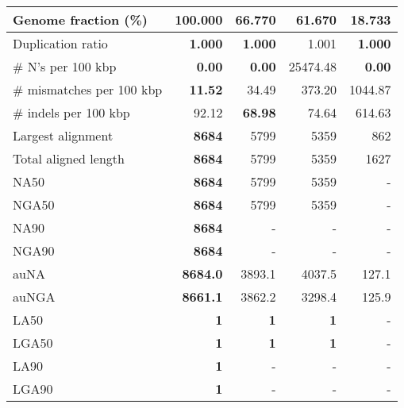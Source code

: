 \documentclass[12pt,a4paper]{article}
\begin{document}
\begin{table}[ht]
\begin{center}
\begin{tabular}{|l*{4}{|r}|}
Genome fraction (\%) & {\bf 100.000} & 66.770 & 61.670 & 18.733 \\ \hline
Duplication ratio & {\bf 1.000} & {\bf 1.000} & 1.001 & {\bf 1.000} \\ \hline
\# N's per 100 kbp & {\bf 0.00} & {\bf 0.00} & 25474.48 & {\bf 0.00} \\ \hline
\# mismatches per 100 kbp & {\bf 11.52} & 34.49 & 373.20 & 1044.87 \\ \hline
\# indels per 100 kbp & 92.12 & {\bf 68.98} & 74.64 & 614.63 \\ \hline
Largest alignment & {\bf 8684} & 5799 & 5359 & 862 \\ \hline
Total aligned length & {\bf 8684} & 5799 & 5359 & 1627 \\ \hline
NA50 & {\bf 8684} & 5799 & 5359 & - \\ \hline
NGA50 & {\bf 8684} & 5799 & 5359 & - \\ \hline
NA90 & {\bf 8684} & - & - & - \\ \hline
NGA90 & {\bf 8684} & - & - & - \\ \hline
auNA & {\bf 8684.0} & 3893.1 & 4037.5 & 127.1 \\ \hline
auNGA & {\bf 8661.1} & 3862.2 & 3298.4 & 125.9 \\ \hline
LA50 & {\bf 1} & {\bf 1} & {\bf 1} & - \\ \hline
LGA50 & {\bf 1} & {\bf 1} & {\bf 1} & - \\ \hline
LA90 & {\bf 1} & - & - & - \\ \hline
LGA90 & {\bf 1} & - & - & - \\ \hline
\end{tabular}
\end{center}
\end{table}
\end{document}
